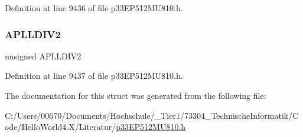 Definition at line 9436 of file p33\+E\+P512\+M\+U810.\+h.

\mbox{\label{structtag_a_c_l_k_d_i_v3_b_i_t_s_a3b3d1c8b8c309e956554f34a1b46e059}} 
\subsubsection{\texorpdfstring{A\+P\+L\+L\+D\+I\+V2}{APLLDIV2}}
{\footnotesize\ttfamily unsigned A\+P\+L\+L\+D\+I\+V2}



Definition at line 9437 of file p33\+E\+P512\+M\+U810.\+h.



The documentation for this struct was generated from the following file\+:\begin{DoxyCompactItemize}
\item 
C\+:/\+Users/00670/\+Documents/\+Hochschule/\+\_\+\+Tier1/73304\+\_\+\+Technische\+Informatik/\+Code/\+Hello\+World4.\+X/\+Literatur/\hyperlink{p33_e_p512_m_u810_8h}{p33\+E\+P512\+M\+U810.\+h}\end{DoxyCompactItemize}
